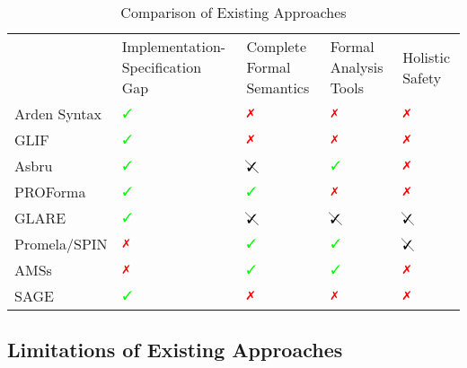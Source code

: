   \begin{table}
  \begin{tabularx}{\textwidth}{
      >{\centering\arraybackslash}X
    || >{\centering\arraybackslash}X
    | >{\centering\arraybackslash}X
    | >{\centering\arraybackslash}X
    | >{\centering\arraybackslash}X
  }
                 & Implementation-Specification Gap & Complete Formal Semantics & Formal Analysis Tools & Holistic Safety  \\
    Arden Syntax & $\greencheck$                               & $\redcross$               & $\redcross$           & $\redcross$ \\
    GLIF         & $\greencheck$                               & $\redcross$               & $\redcross$           & $\redcross$ \\
    Asbru        & $\greencheck$                               & $\cancelcheck$            & $\greencheck$         & $\redcross$ \\
    PROForma     & $\greencheck$                               & $\greencheck$             & $\redcross$           & $\redcross$ \\
    GLARE        & $\greencheck$                               & $\cancelcheck$            & $\cancelcheck$        & $\cancelcheck$ \\
    Promela/SPIN & $\redcross$                                 & $\greencheck$             & $\greencheck$         & $\cancelcheck$ \\
    AMSs         & $\redcross$                                 & $\greencheck$             & $\greencheck$         & $\redcross$ \\
    SAGE         & $\greencheck$                               & $\redcross$               & $\redcross$           & $\redcross$ \\
  \end{tabularx}
  \caption{Comparison of Existing Approaches}\label{table:existing-approaches}
  \end{table}

\subsection{Limitations of Existing Approaches}

